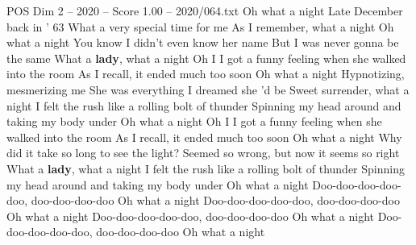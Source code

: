 \begin{textsample}{POS Dim 2 – 2020 – Score 1.00 – 2020/064.txt}  \label{ex:f2_pos_023}
Oh what a night Late December back in ' 63 What a very special time for me As I remember, what a night Oh what a night You know I didn't even know her name But I was never gonna be the same What a \textbf{lady}, what a night Oh I I got a funny feeling when she walked into the room As I recall, it ended much too soon Oh what a night Hypnotizing, mesmerizing me She was everything I dreamed she 'd be Sweet surrender, what a night I felt the rush like a rolling bolt of thunder Spinning my head around and taking my body under Oh what a night Oh I I got a funny feeling when she walked into the room As I recall, it ended much too soon Oh what a night Why did it take so long to see the light?
Seemed so wrong, but now it seems so right What a \textbf{lady}, what a night I felt the rush like a rolling bolt of thunder Spinning my head around and taking my body under Oh what a night Doo-doo-doo-doo-doo, doo-doo-doo-doo Oh what a night Doo-doo-doo-doo-doo, doo-doo-doo-doo Oh what a night Doo-doo-doo-doo-doo, doo-doo-doo-doo Oh what a night Doo-doo-doo-doo-doo, doo-doo-doo-doo Oh what a night

\end{textsample}
